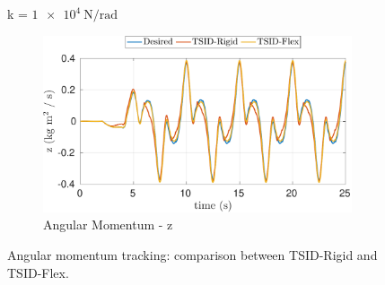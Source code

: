 \begin{figure}[t]
\begin{myframe}{k = $\SI{1e4}{\newton \per \radian}$}
\begin{subfigure}[b]{0.49\textwidth}
        \centering
        \includegraphics[width=\columnwidth]{chapter_flexible_joints/figures/comparison_10000_angular_momentum_z.pdf}
        \caption{Angular Momentum - z}
    \end{subfigure}
    \end{myframe}
    \caption{Angular momentum tracking: comparison between TSID-Rigid and TSID-Flex.\label{fig:angular_momentum_tracking_10000_rigid_flex}}
\end{figure}

